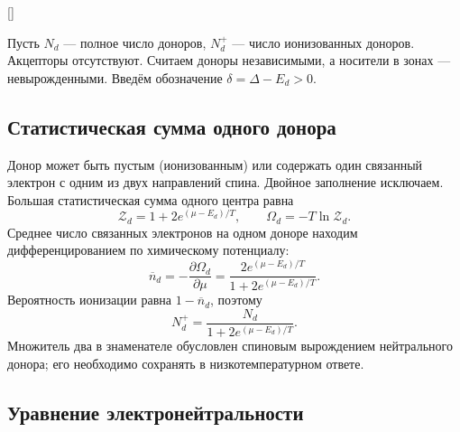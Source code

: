 \documentclass[../final.tex]{subfiles}
\begin{document}
\begin{rbox}[left=16pt,right=16pt,top=12pt,bottom=10pt]{[]}
\centering
{}
\end{rbox}

\solution
Пусть $N_d$ --- полное число доноров, $N_d^+$ --- число ионизованных
доноров. Акцепторы отсутствуют. Считаем доноры независимыми,
а носители в зонах --- невырожденными. Введём обозначение
$\delta=\Delta-E_d>0$.

\subsection*{Статистическая сумма одного донора}

Донор может быть пустым (ионизованным) или содержать один связанный
электрон с одним из двух направлений спина. Двойное заполнение
исключаем. Большая статистическая сумма одного центра равна
\[
\mathcal Z_d=1+2e^{(\mu-E_d)/T},\qquad
    \Omega_d=-T\ln\mathcal Z_d.
\]
Среднее число связанных электронов на одном доноре находим
дифференцированием по химическому потенциалу:
\[
\overline n_d=-\frac{\partial\Omega_d}{\partial\mu}
    =\frac{2e^{(\mu-E_d)/T}}{1+2e^{(\mu-E_d)/T}}.
\]
Вероятность ионизации равна $1-\overline n_d$, поэтому
\[
N_d^+=\frac{N_d}{1+2e^{(\mu-E_d)/T}}.
\]
Множитель два в знаменателе обусловлен спиновым вырождением
нейтрального донора; его необходимо сохранять в низкотемпературном ответе.

\subsection*{Уравнение электронейтральности}
\end{document}
